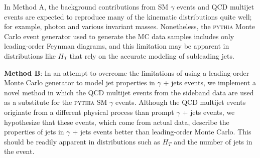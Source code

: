\documentclass[12pt,twoside,letterpaper,doublespace]{article}
\begin{document}
In Method A, the background contributions from SM $\gamma$ events and QCD multijet events are expected to reproduce many of the kinematic distributions quite well; for example, photon \et and various invariant masses.  Nonetheless, the \textsc{pythia} Monte Carlo event generator used to generate the MC data samples includes only leading-order Feynman diagrams, and this limitation may be apparent in distributions like $H_T$ that rely on the accurate modeling of subleading jets.




\vspace{2ex}

\textbf{Method B}:  In an attempt to overcome the limitations of using a leading-order Monte Carlo generator to model jet properties in $\gamma$ + jets events, we implement a novel method in which the QCD multijet events from the sideband data are used as a substitute for the \textsc{pythia} SM $\gamma$ events.  Although the QCD multijet events originate from a different physical process than prompt $\gamma$ + jets events, we hypothesize that these events, which come from actual data, describe the properties of jets in $\gamma$ + jets events better than leading-order Monte Carlo.  This should be readily apparent in distributions such as $H_T$ and the number of jets in the event.


\end{document}
